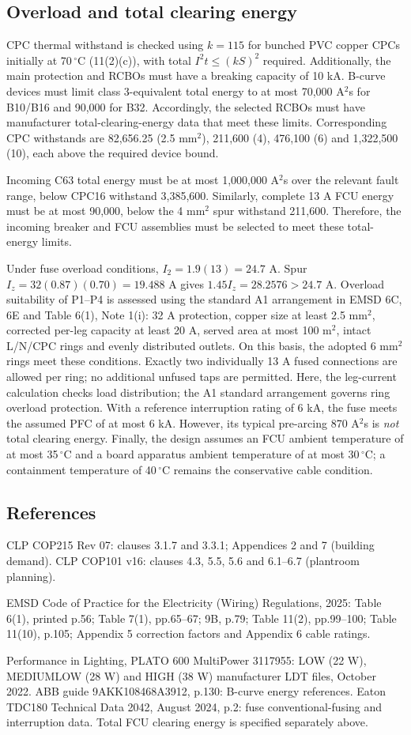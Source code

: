 \subsection*{Overload and total clearing energy}
CPC thermal withstand is checked using $k=115$ for bunched PVC copper CPCs initially at 70\,$^\circ$C (11(2)(c)), with total $I^2t\le(kS)^2$ required. Additionally, the main protection and RCBOs must have a breaking capacity of 10 kA. B-curve devices must limit class 3-equivalent total energy to at most 70,000 A$^2$s for B10/B16 and 90,000 for B32. Accordingly, the selected RCBOs must have manufacturer total-clearing-energy data that meet these limits. Corresponding CPC withstands are 82,656.25 (2.5 mm$^2$), 211,600 (4), 476,100 (6) and 1,322,500 (10), each above the required device bound.

Incoming C63 total energy must be at most 1,000,000 A$^2$s over the relevant fault range, below CPC16 withstand 3,385,600. Similarly, complete 13 A FCU energy must be at most 90,000, below the 4 mm$^2$ spur withstand 211,600. Therefore, the incoming breaker and FCU assemblies must be selected to meet these total-energy limits.

Under fuse overload conditions, $I_2=1.9(13)=24.7$ A. Spur $I_z=32(0.87)(0.70)=19.488$ A gives $1.45I_z=28.2576>24.7$ A. Overload suitability of P1--P4 is assessed using the standard A1 arrangement in EMSD 6C, 6E and Table 6(1), Note 1(i): 32 A protection, copper size at least 2.5 mm$^2$, corrected per-leg capacity at least 20 A, served area at most 100 m$^2$, intact L/N/CPC rings and evenly distributed outlets. On this basis, the adopted 6 mm$^2$ rings meet these conditions. Exactly two individually 13 A fused connections are allowed per ring; no additional unfused taps are permitted. Here, the leg-current calculation checks load distribution; the A1 standard arrangement governs ring overload protection. With a reference interruption rating of 6 kA, the fuse meets the assumed PFC of at most 6 kA. However, its typical pre-arcing 870 A$^2$s is \emph{not} total clearing energy. Finally, the design assumes an FCU ambient temperature of at most 35\,$^\circ$C and a board apparatus ambient temperature of at most 30\,$^\circ$C; a containment temperature of 40\,$^\circ$C remains the conservative cable condition.
\subsection*{References}
CLP COP215 Rev 07: clauses 3.1.7 and 3.3.1; Appendices 2 and 7 (building demand). CLP COP101 v16: clauses 4.3, 5.5, 5.6 and 6.1--6.7 (plantroom planning).

EMSD Code of Practice for the Electricity (Wiring) Regulations, 2025: Table 6(1), printed p.56; Table 7(1), pp.65--67; 9B, p.79; Table 11(2), pp.99--100; Table 11(10), p.105; Appendix 5 correction factors and Appendix 6 cable ratings.

Performance in Lighting, PLATO 600 MultiPower 3117955: LOW (22 W), MEDIUMLOW (28 W) and HIGH (38 W) manufacturer LDT files, October 2022. ABB guide 9AKK108468A3912, p.130: B-curve energy references. Eaton TDC180 Technical Data 2042, August 2024, p.2: fuse conventional-fusing and interruption data. Total FCU clearing energy is specified separately above.
